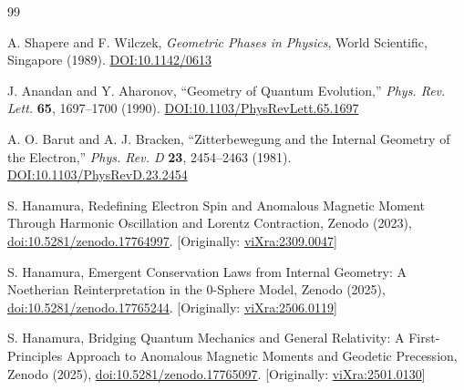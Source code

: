 \documentclass[%
 reprint,
 amsmath,amssymb,
 aps,
]{revtex4-1}
\numberwithin{equation}{section}%
\begin{document}
\begin{thebibliography}{99}

A. Shapere and F. Wilczek, \textit{Geometric Phases in Physics}, World Scientific, Singapore (1989). \href{https://doi.org/10.1142/0613}{DOI:10.1142/0613}

J. Anandan and Y. Aharonov, ``Geometry of Quantum Evolution,'' \textit{Phys. Rev. Lett.} \textbf{65}, 1697–1700 (1990). \href{https://doi.org/10.1103/PhysRevLett.65.1697}{DOI:10.1103/PhysRevLett.65.1697}

A. O. Barut and A. J. Bracken, ``Zitterbewegung and the Internal Geometry of the Electron,'' \textit{Phys. Rev. D} \textbf{23}, 2454–2463 (1981). \href{https://doi.org/10.1103/PhysRevD.23.2454}{DOI:10.1103/PhysRevD.23.2454}

S. Hanamura, Redefining Electron Spin and Anomalous Magnetic Moment Through Harmonic Oscillation and Lorentz Contraction, Zenodo (2023), \href{https://doi.org/10.5281/zenodo.17764997}{doi:10.5281/zenodo.17764997}. [Originally: \href{https://vixra.org/abs/2309.0047}{viXra:2309.0047}]

S. Hanamura, Emergent Conservation Laws from Internal Geometry: A Noetherian Reinterpretation in the 0-Sphere Model, Zenodo (2025), \href{https://doi.org/10.5281/zenodo.17765244}{doi:10.5281/zenodo.17765244}. [Originally: \href{https://vixra.org/abs/2506.0119}{viXra:2506.0119}]

S. Hanamura, Bridging Quantum Mechanics and General Relativity: A First-Principles Approach to Anomalous Magnetic Moments and Geodetic Precession, Zenodo (2025), \href{https://doi.org/10.5281/zenodo.17765097}{doi:10.5281/zenodo.17765097}. [Originally: \href{https://vixra.org/abs/2501.0130}{viXra:2501.0130}]


\end{thebibliography}
\end{document}
